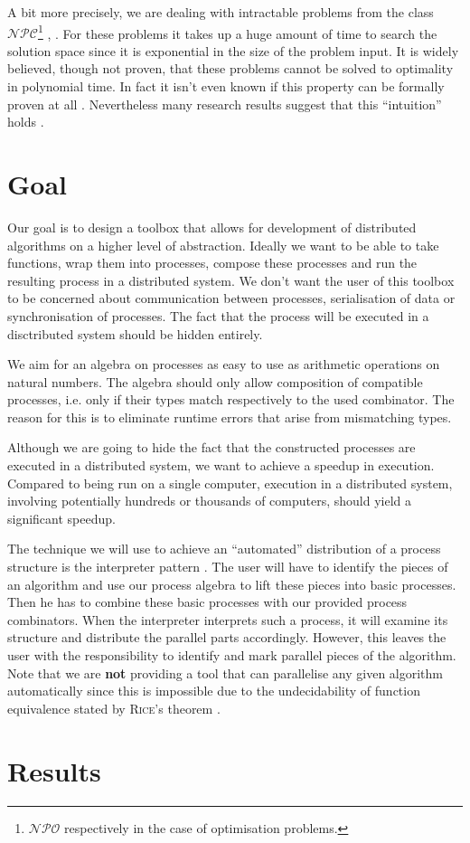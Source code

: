A bit more precisely, we are dealing with intractable problems from the class $\mathcal{NPC}$\footnote{$\mathcal{NPO}$ respectively in the case of optimisation problems.} \cite{Garey:1979:CIG:578533}, \cite{Hopcroft:2006:IAT:1196416}. For these problems it takes up a huge amount of time to search the solution space since it is exponential in the size of the problem input. It is widely believed, though not proven, that these problems cannot be solved to optimality in polynomial time. In fact it isn't even known if this property can be formally proven at all \cite{}. Nevertheless many research results suggest that this \enquote{intuition} holds \cite{} \cite{} \cite{}.

\section{Goal}
Our goal is to design a toolbox that allows for development of distributed algorithms on a higher level of abstraction. Ideally we want to be able to take functions, wrap them into processes, compose these processes and run the resulting process in a distributed system. We don't want the user of this toolbox to be concerned about communication between processes, serialisation of data or synchronisation of processes. The fact that the process will be executed in a disctributed system should be hidden entirely.

We aim for an algebra on processes as easy to use as arithmetic operations on natural numbers. The algebra should only allow composition of compatible processes, i.e. only if their types match respectively to the used combinator. The reason for this is to eliminate runtime errors that arise from mismatching types.

Although we are going to hide the fact that the constructed processes are executed in a distributed system, we want to achieve a speedup in execution. Compared to being run on a single computer, execution in a distributed system, involving potentially hundreds or thousands of computers, should yield a significant speedup.

The technique we will use to achieve an \enquote{automated} distribution of a process structure is the interpreter pattern \cite{Gamma:1995:DPE:186897}. The user will have to identify the pieces of an algorithm and use our process algebra to lift these pieces into basic processes. Then he has to combine these basic processes with our provided process combinators. When the interpreter interprets such a process, it will examine its structure and distribute the parallel parts accordingly. However, this leaves the user with the responsibility to identify and mark parallel pieces of the algorithm. Note that we are \textbf{not} providing a tool that can parallelise any given algorithm automatically since this is impossible due to the undecidability of function equivalence stated by \textsc{Rice}'s theorem \cite{}.

\section{Results}